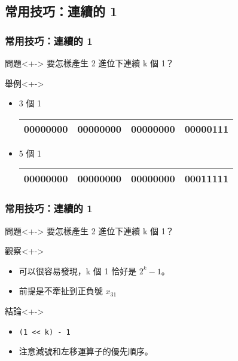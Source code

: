 \documentclass[utf8]{beamer}
\begin{document}
\begin{CJK}{UTF8}{bkai}
\subsection{常用技巧：連續的 1}

\begin{frame}[fragile]
  \frametitle{常用技巧：連續的 1}
  \begin{block}{問題}<+->
  要怎樣產生 2 進位下連續 k 個 1？
  \end{block}
  \begin{exampleblock}{舉例}<+->
    \begin{itemize}
    \item 3 個 1
      \begin{table}[h]
        \begin{tabular}{|c|c|c|c|}
        \hline
        00000000 & 00000000 & 00000000 & 00000\alert{111}\\
        \hline
        \end{tabular}
      \end{table}
    \item<+-> 5 個 1
      \begin{table}[h]
        \begin{tabular}{|c|c|c|c|}
        \hline
        00000000 & 00000000 & 00000000 & 000\alert{11111}\\
        \hline
        \end{tabular}
      \end{table}
    \end{itemize}
  \end{exampleblock}
\end{frame}

\begin{frame}[fragile]
  \frametitle{常用技巧：連續的 1}
  \begin{block}{問題}<+->
  要怎樣產生 2 進位下連續 k 個 1？
  \end{block}
  \begin{exampleblock}{觀察}<+->
    \begin{itemize}
    \item 可以很容易發現，k 個 1 恰好是 $2^k-1$。
    \item<+-> \alert{前提是不牽扯到正負號 $x_{31}$}
    \end{itemize}
  \end{exampleblock}
  \begin{alertblock}{結論}<+->
    \begin{itemize}
    \item \lstinline{(1 << k) - 1}{}
    \item<+-> 注意減號和左移運算子的優先順序。
    \end{itemize}
  \end{alertblock}
\end{frame}


\end{CJK}
\end{document}
